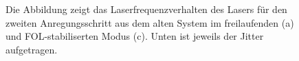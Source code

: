 \begin{figure}[hp]
 	\centering
 	\footnotesize
 	\fbox{\parbox{\dimexpr \linewidth - 2\fboxrule - 2\fboxsep}{
 	\subfigure[]{
		\label{subfig:laserstabilitaet_alt_freilaufend}
		
		}
	 \subfigure[]{
		\label{subfig:laserstabilitaet_alt_FOL}
		
		}
	}}
	\caption[Laserfrequenzverhalten \textit{TA-Pro}]{Die Abbildung zeigt das
	Laserfrequenzverhalten des Lasers für den zweiten Anregungsschritt aus dem
	alten System im freilaufenden (a) und FOL-stabiliserten Modus (c). Unten ist
	jeweils der Jitter aufgetragen.}
	\label{fig:laserstabilitaet_c}
\end{figure}
